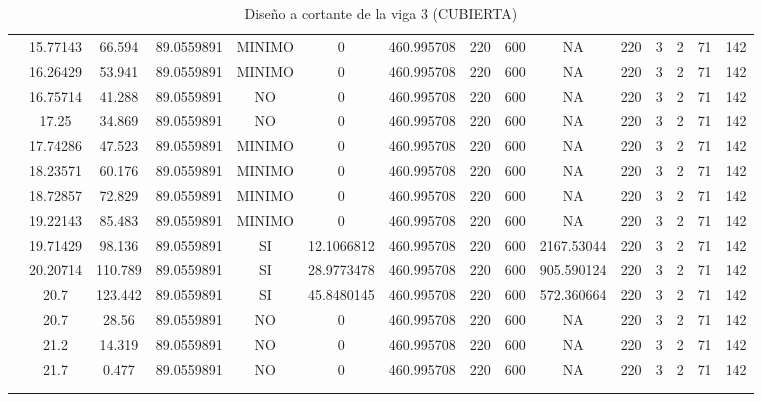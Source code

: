 \begin{table}[H]
{\begin{tabular}{|c|c|c|c|c|c|c|c|c|c|c|c|c|c|c|}
\cline{2-15}    & 15.77143 & 66.594 & 89.0559891 & MINIMO & 0   & 460.995708 & 220 & 600 & NA  & 220 & 3   & 2   & 71  & 142 \bigstrut\\
\cline{2-15}    & 16.26429 & 53.941 & 89.0559891 & MINIMO & 0   & 460.995708 & 220 & 600 & NA  & 220 & 3   & 2   & 71  & 142 \bigstrut\\
\cline{2-15}    & 16.75714 & 41.288 & 89.0559891 & NO  & 0   & 460.995708 & 220 & 600 & NA  & 220 & 3   & 2   & 71  & 142 \bigstrut\\
\cline{2-15}    & 17.25 & 34.869 & 89.0559891 & NO  & 0   & 460.995708 & 220 & 600 & NA  & 220 & 3   & 2   & 71  & 142 \bigstrut\\
\cline{2-15}    & 17.74286 & 47.523 & 89.0559891 & MINIMO & 0   & 460.995708 & 220 & 600 & NA  & 220 & 3   & 2   & 71  & 142 \bigstrut\\
\cline{2-15}    & 18.23571 & 60.176 & 89.0559891 & MINIMO & 0   & 460.995708 & 220 & 600 & NA  & 220 & 3   & 2   & 71  & 142 \bigstrut\\
\cline{2-15}    & 18.72857 & 72.829 & 89.0559891 & MINIMO & 0   & 460.995708 & 220 & 600 & NA  & 220 & 3   & 2   & 71  & 142 \bigstrut\\
\cline{2-15}    & 19.22143 & 85.483 & 89.0559891 & MINIMO & 0   & 460.995708 & 220 & 600 & NA  & 220 & 3   & 2   & 71  & 142 \bigstrut\\
\cline{2-15}    & 19.71429 & 98.136 & 89.0559891 & SI  & 12.1066812 & 460.995708 & 220 & 600 & 2167.53044 & 220 & 3   & 2   & 71  & 142 \bigstrut\\
\cline{2-15}    & 20.20714 & 110.789 & 89.0559891 & SI  & 28.9773478 & 460.995708 & 220 & 600 & 905.590124 & 220 & 3   & 2   & 71  & 142 \bigstrut\\
\cline{2-15}    & 20.7 & 123.442 & 89.0559891 & SI  & 45.8480145 & 460.995708 & 220 & 600 & 572.360664 & 220 & 3   & 2   & 71  & 142 \bigstrut\\
\cline{2-15}    & 20.7 & 28.56 & 89.0559891 & NO  & 0   & 460.995708 & 220 & 600 & NA  & 220 & 3   & 2   & 71  & 142 \bigstrut\\
\cline{2-15}    & 21.2 & 14.319 & 89.0559891 & NO  & 0   & 460.995708 & 220 & 600 & NA  & 220 & 3   & 2   & 71  & 142 \bigstrut\\
\cline{2-15}    & 21.7 & 0.477 & 89.0559891 & NO  & 0   & 460.995708 & 220 & 600 & NA  & 220 & 3   & 2   & 71  & 142 \bigstrut\\
\cline{2-15}    &     &     &     &     &     &     &     &     &     &     &     &     &     &  \bigstrut\\
\cline{2-15}    &     &     &     &     &     &     &     &     &     &     &     &     &     &  \bigstrut\\
\hline
\end{tabular}%



  
 
  }%
    \caption{Diseño a cortante de la viga 3 (CUBIERTA) }
  \label{tab:C VG3 CUB }%
\end{table}%
